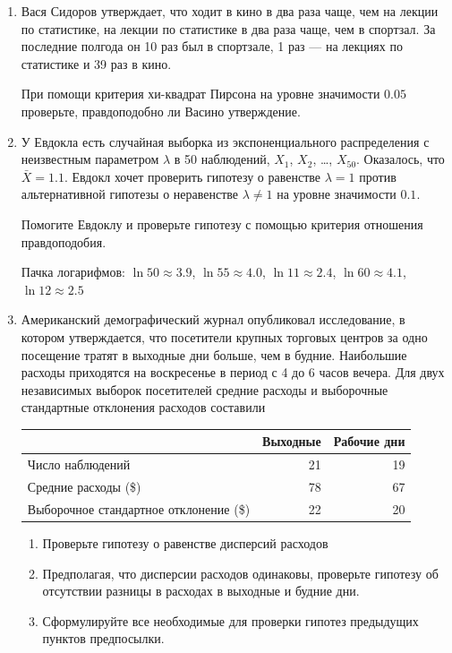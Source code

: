 \begin{enumerate}
\item	Вася Сидоров утверждает, что ходит в кино в два раза чаще, чем на лекции по статистике, на лекции по статистике в два раза чаще, чем в спортзал. За последние полгода он 10 раз был в спортзале, 1 раз — на лекциях по статистике и 39 раз в кино.

При помощи критерия хи-квадрат Пирсона на уровне значимости $0.05$ проверьте, правдоподобно ли Васино утверждение.

\item У Евдокла есть случайная выборка из экспоненциального распределения с неизвестным параметром $\lambda$ в 50 наблюдений, $X_1$, $X_2$, \ldots, $X_{50}$. Оказалось, что $\bar X = 1.1$. Евдокл хочет проверить гипотезу о равенстве $\lambda = 1$ против альтернативной гипотезы о неравенстве $\lambda \neq 1$ на уровне значимости $0.1$.

Помогите Евдоклу и проверьте гипотезу с помощью критерия отношения правдоподобия.

Пачка логарифмов: $\ln 50 \approx 3.9$, $\ln 55 \approx 4.0$, $\ln 11 \approx 2.4$, $\ln 60 \approx 4.1$, $\ln 12 \approx 2.5$


\item Американский демографический журнал опубликовал исследование, в котором утверждается, что посетители крупных торговых центров за одно посещение тратят  в выходные дни больше, чем в будние. Наибольшие расходы приходятся на воскресенье в период с 4 до 6 часов вечера. Для двух независимых выборок посетителей средние расходы и выборочные стандартные отклонения расходов составили

\begin{tabular}{lrr}
\toprule
 & Выходные & Рабочие дни \\
\midrule
Число наблюдений & 21 & 19 \\
Средние расходы (\$) & 78 & 67 \\
Выборочное стандартное отклонение (\$) & 22 & 20 \\
\bottomrule
\end{tabular}


\begin{enumerate}
\item Проверьте гипотезу о равенстве дисперсий расходов
\item Предполагая, что дисперсии расходов одинаковы, проверьте гипотезу об отсутствии разницы в расходах в выходные и будние дни.
\item Сформулируйте все необходимые для проверки гипотез предыдущих пунктов предпосылки.
\end{enumerate}




\end{enumerate}
